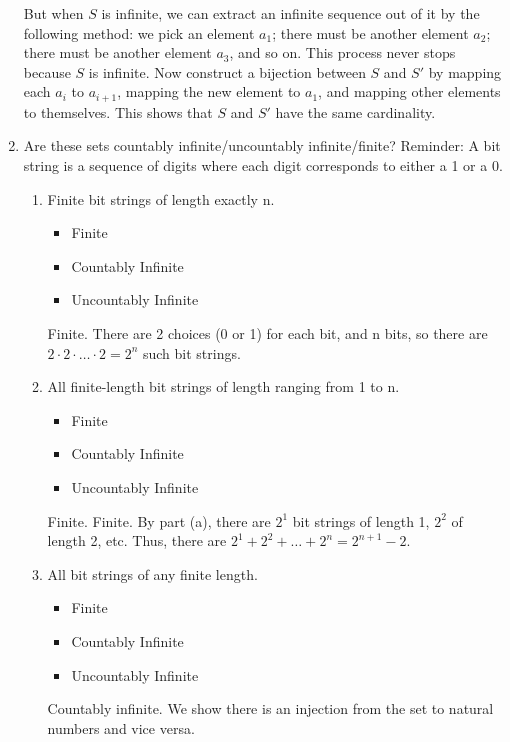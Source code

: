 \documentclass[11pt,preview]{standalone} %
\begin{document}
\begin{enumerate}
\begin{Multi}
	But when $S$ is infinite, we can extract an infinite sequence out of it by the following method: we pick an element $a_1$; there must be another element $a_2$; there must be another element $a_3$, and so on. This process never stops because $S$ is infinite. Now construct a bijection between $S$ and $S'$ by mapping each $a_i$ to $a_{i+1}$, mapping the new element to $a_1$, and mapping other elements to themselves. This shows that $S$ and $S'$ have the same cardinality.
	\end{Multi}

	\item Are these sets countably infinite/uncountably infinite/finite? Reminder: A bit string is a sequence of digits where each digit corresponds to either a 1 or a 0.

	\begin{enumerate}
		\item Finite bit strings of length exactly n.
		\begin{Choices}
		\begin{itemize}
			\TrueChoice\item Finite
			\FalseChoice\item Countably Infinite
			\FalseChoice\item Uncountably Infinite
		\end{itemize}
		\Solution Finite. There are 2 choices (0 or 1) for each bit, and n bits, so 
     	there are $2 \cdot 2 \cdot \ldots \cdot 2 = 2^n$ such bit strings.
		\end{Choices}

		\item All finite-length bit strings of length ranging from 1 to n.
		\begin{Choices}
		\begin{itemize}
			\TrueChoice\item Finite
			\FalseChoice\item Countably Infinite
			\FalseChoice\item Uncountably Infinite
		\end{itemize}
		\Solution Finite. Finite. By part (a), there are $2^1$ bit strings of length 1, $2^2$ of 
     	length 2, etc. Thus, there are $2^1 + 2^2 + \ldots + 2^n = 2^{n + 1}- 2$.
		\end{Choices}

		\item All bit strings of any finite length.
		\begin{Choices}
		\begin{itemize}
			\FalseChoice\item Finite
			\TrueChoice\item Countably Infinite
			\FalseChoice\item Uncountably Infinite
		\end{itemize}
		\Solution Countably infinite. We show there is an injection from the set to natural numbers and vice versa.


\end{Choices}
\end{enumerate}
\end{enumerate}
\end{document}
